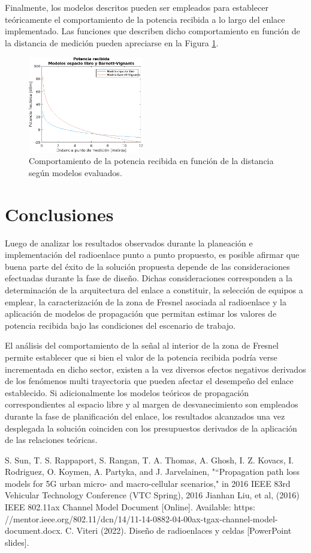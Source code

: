\documentclass[conference]{IEEEtran}
\begin{document}
Finalmente, los modelos descritos pueden ser empleados para establecer teóricamente el comportamiento de la potencia 
recibida a lo largo del enlace implementado. Las funciones que describen dicho comportamiento en función de la distancia 
de medición pueden apreciarse en la Figura \ref{fig:Potencia_Modelos}. 
\begin{figure}
    \centering
          \includegraphics[width=0.45\textwidth]{Potencia_Modelos.png}
        \caption{Comportamiento de la potencia recibida en función de la distancia según modelos evaluados.
        }
        \label{fig:Potencia_Modelos}
\end{figure}
\section{Conclusiones}
Luego de analizar los resultados observados durante la planeación e implementación del radioenlace punto a punto propuesto,
es posible afirmar que buena parte del éxito de la solución propuesta depende de las consideraciones efectuadas durante la fase
de diseño. Dichas consideraciones corresponden a la determinación de la arquitectura del enlace a constituir, la selección de equipos a emplear, 
la caracterización de la zona de Fresnel asociada al radioenlace y la aplicación de modelos de propagación que permitan estimar 
los valores de potencia recibida bajo las condiciones del escenario de trabajo. 

El análisis del comportamiento de la señal al interior de la zona de Fresnel permite establecer que si bien el valor de la potencia
recibida podría verse incrementada en dicho sector, existen a la vez diversos efectos negativos derivados de los fenómenos multi trayectoria
que pueden afectar el desempeño del enlace establecido. Si adicionalmente los modelos teóricos de propagación correspondientes al espacio libre y 
al margen de desvanecimiento son empleados durante la fase de planificación del enlace, los resultados alcanzados una vez desplegada la solución
coinciden con los presupuestos derivados de la aplicación de las relaciones teóricas.
\begin{thebibliography}{00}
     S. Sun, T. S. Rappaport, S. Rangan, T. A. Thomas, A. Ghosh, I. Z. Kovacs, I. Rodriguez, O. Koymen, A. Partyka,
    and J. Jarvelainen, "“Propagation path loss models for 5G urban micro- and macro-cellular scenarios," in 2016
    IEEE 83rd Vehicular Technology Conference (VTC Spring), 2016
     Jianhan Liu, et al, (2016) IEEE 802.11ax Channel Model Document  [Online]. Available: https:
    //mentor.ieee.org/802.11/dcn/14/11-14-0882-04-00ax-tgax-channel-model-document.docx.
     C. Viteri (2022). Diseño de radioenlaces y celdas [PowerPoint slides]. 
\end{thebibliography}
\end{document}
